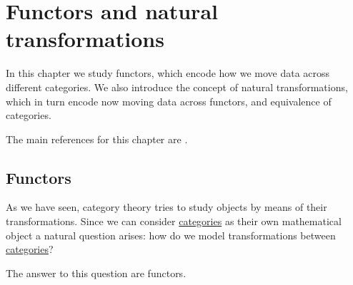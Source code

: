 \documentclass[../../main]{subfiles}
\begin{document}
\chapter{Functors and natural transformations}\label{ch:functors-natural-transformations}

In this chapter we study functors, which encode how we move data across different categories.
We also introduce the concept of natural transformations, which in turn encode now moving data across functors, and equivalence of categories.

The main references for this chapter are \cite{riehlCategoryTheoryContext, maclaneCategoriesWorkingMathematician1978, aluffiAlgebraChapter02009}.

\section{Functors}

As we have seen, category theory tries to study objects by means of their transformations.
Since we can consider \hyperref[def:category]{categories} as their own mathematical object a natural question arises: how do we model transformations between \hyperref[def:category]{categories}?

The answer to this question are functors.
\end{document}
